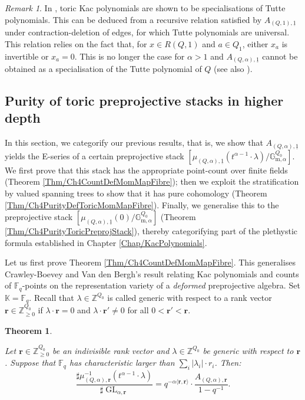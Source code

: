 \documentclass[11pt,english]{article}
\numberwithin{equation}{section}
\numberwithin{figure}{section}
\theoremstyle{definition}
\theoremstyle{plain}
\newtheorem{thm}[df]{Theorem}
\theoremstyle{remark}
\newtheorem{rmk}[df]{Remark}
\DeclareMathOperator{\GL}{GL}
\newcommand\rr{\mathbf{r}}
\newcommand\ZZ{\mathbb{Z}}
\newcommand\FF{\mathbb{F}}
\newcommand\KK{\mathbb{K}}
\begin{document}
\begin{rmk}

In \cite{AMRV22}, toric Kac polynomials are shown to be specialisations
of Tutte polynomials. This can be deduced from a recursive relation
satisfied by $A_{(Q,1),\underline{1}}$ under contraction-deletion
of edges, for which Tutte polynomials are universal. This relation
relies on the fact that, for $x\in R(Q,1)$ and $a\in Q_{1}$, either
$x_{a}$ is invertible or $x_{a}=0$. This is no longer the case for
$\alpha>1$ and $A_{(Q,\alpha),\underline{1}}$ cannot be obtained
as a specialisation of the Tutte polynomial of $Q$ (see also \cite[Prop. 7.16.]{HLRV24}).
\end{rmk}

\subsection{Purity of toric preprojective stacks in higher depth \label{Subsect/Purity}}

In this section, we categorify our previous results, that is, we show
that $A_{(Q,\alpha),\underline{1}}$ yields the E-series of a certain
preprojective stack $\left[\mu_{(Q,\alpha),\underline{1}}(t^{\alpha-1}\cdot\lambda)/\mathbb{G}_{\mathrm{m},\alpha}^{Q_{0}}\right]$.
We first prove that this stack has the appropriate point-count over
finite fields (Theorem \ref{Thm/Ch4CountDefMomMapFibre}); then we
exploit the stratification by valued spanning trees to show that it
has pure cohomology (Theorem \ref{Thm/Ch4PurityDefToricMomMapFibre}).
Finally, we generalise this to the preprojective stack $\left[\mu_{(Q,\alpha),\underline{1}}(0)/\mathbb{G}_{\mathrm{m},\alpha}^{Q_{0}}\right]$
(Theorem \ref{Thm/Ch4PurityToricPreprojStack}), thereby categorifying
part of the plethystic formula established in Chapter \ref{Chap/KacPolynomials}. 

Let us first prove Theorem \ref{Thm/Ch4CountDefMomMapFibre}. This
generalises Crawley-Boevey and Van den Bergh's result relating Kac
polynomials and counts of $\FF_{q}$-points on the representation
variety of a \textit{deformed} preprojective algebra. Set $\KK=\FF_{q}$.
Recall that $\lambda\in\ZZ^{Q_{0}}$ is called generic with respect
to a rank vector $\rr\in\ZZ_{\geq0}^{Q_{0}}$ if $\lambda\cdot\rr=0$
and $\lambda\cdot\rr'\ne0$ for all $0<\rr'<\rr$.

\begin{thm} \label{Thm/CountMomMapGenFib}

Let $\rr\in\ZZ_{\geq0}^{Q_{0}}$ be an indivisible rank vector and
$\lambda\in\ZZ^{Q_{0}}$ be generic with respect to $\rr$. Suppose
that $\FF_{q}$ has characteristic larger than $\sum_{i}\vert\lambda_{i}\vert\cdot r_{i}$.
Then: \[
\frac{\sharp\mu_{(Q,\alpha),\rr}^{-1}(t^{\alpha-1}\cdot\lambda)}{\sharp\GL_{\alpha,\rr}}
=q^{-\alpha\langle\rr,\rr\rangle}\cdot\frac{A_{(Q,\alpha),\rr}}{1-q^{-1}}.
\]

\end{thm}
\end{document}
